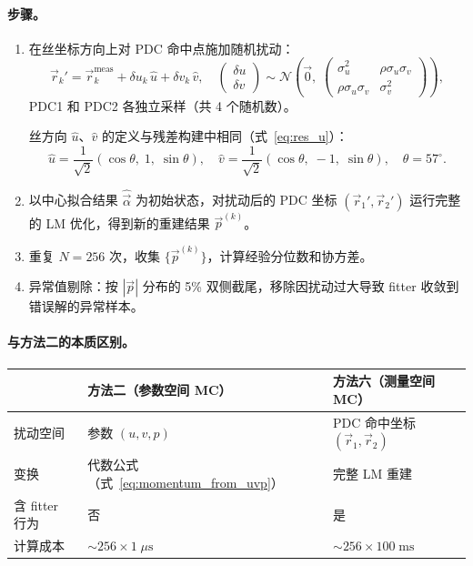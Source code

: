 \documentclass[a4paper, 11pt]{article}
\begin{document}
\paragraph{步骤。}
\begin{enumerate}[nosep]
  \item 在丝坐标方向上对 PDC 命中点施加随机扰动：
  \begin{equation}
    \vec{r}_k' = \vec{r}_k^\mathrm{meas} + \delta u_k \, \hat{u} + \delta v_k \, \hat{v},
    \quad
    \begin{pmatrix} \delta u \\ \delta v \end{pmatrix}
    \sim \mathcal{N}\!\left(\vec{0},\;
    \begin{pmatrix} \sigma_u^2 & \rho\sigma_u\sigma_v \\ \rho\sigma_u\sigma_v & \sigma_v^2 \end{pmatrix}
    \right),
  \end{equation}
  PDC1 和 PDC2 各独立采样（共 4 个随机数）。

  丝方向 $\hat{u}$、$\hat{v}$ 的定义与残差构建中相同（式~\eqref{eq:res_u}）：
  \begin{equation}
    \hat{u} = \frac{1}{\sqrt{2}}(\cos\theta,\; 1,\; \sin\theta), \quad
    \hat{v} = \frac{1}{\sqrt{2}}(\cos\theta,\; -1,\; \sin\theta), \quad \theta = 57^\circ.
  \end{equation}

  \item 以中心拟合结果 $\hat{\vec{\alpha}}$ 为初始状态，对扰动后的 PDC 坐标 $(\vec{r}_1', \vec{r}_2')$ 运行完整的 LM 优化，得到新的重建结果 $\vec{p}^{(k)}$。

  \item 重复 $N = 256$ 次，收集 $\{\vec{p}^{(k)}\}$，计算经验分位数和协方差。

  \item 异常值剔除：按 $|\vec{p}|$ 分布的 5\% 双侧截尾，移除因扰动过大导致 fitter 收敛到错误解的异常样本。
\end{enumerate}

\paragraph{与方法二的本质区别。}
\begin{table}[H]
\centering
\begin{tabular}{lll}
\toprule
 & 方法二（参数空间 MC） & 方法六（测量空间 MC） \\
\midrule
扰动空间 & 参数 $(u, v, p)$ & PDC 命中坐标 $(\vec{r}_1, \vec{r}_2)$ \\
变换 & 代数公式（式~\eqref{eq:momentum_from_uvp}） & 完整 LM 重建 \\
含 fitter 行为 & 否 & 是 \\
计算成本 & $\sim 256 \times 1\;\mu\mathrm{s}$ & $\sim 256 \times 100\;\mathrm{ms}$ \\
\bottomrule
\end{tabular}
\end{table}
\end{document}
